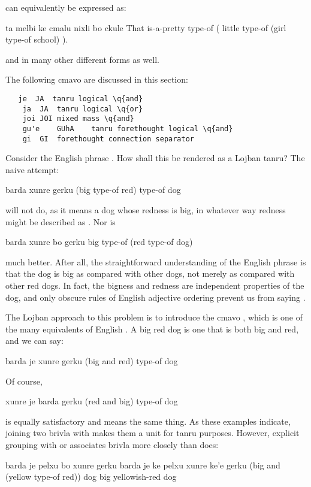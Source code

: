 {\noindent}can equivalently be expressed as:
\begin{example}
ta melbi\n
\T	ke cmalu nixli bo ckule \n
That is-a-pretty\n
\T	type-of ( little type-of (girl type-of school) ).
\end{example}

{\noindent}and in many other different forms as well.



The following cmavo are discussed in this section:
\begin{verbatim}
   je  JA  tanru logical \q{and}
    ja  JA  tanru logical \q{or}
    joi JOI mixed mass \q{and}
    gu'e    GUhA    tanru forethought logical \q{and}
    gi  GI  forethought connection separator
\end{verbatim}
    Consider the English phrase . How shall this be
    rendered as a Lojban tanru? The naive attempt:
\begin{example}
barda xunre gerku\n
(big type-of red) type-of dog
\end{example}

{\noindent}will not do, as it means a dog whose redness is big, in
    whatever way redness might be described as . Nor is
\begin{example}
barda xunre bo gerku\n
big type-of (red type-of dog)
\end{example}

{\noindent}much better. After all, the straightforward understanding of
    the English phrase is that the dog is big as compared with
    other dogs, not merely as compared with other red dogs. In
    fact, the bigness and redness are independent properties of the
    dog, and only obscure rules of English adjective ordering
    prevent us from saying . 

The Lojban approach to this problem is to introduce the
    cmavo , which is one of the many equivalents of English
    . A big red dog is one that is both big and red, and we
    can say:
\begin{example}
barda je xunre gerku\n
(big and red) type-of dog
\end{example}

Of course,
\begin{example}
xunre je barda gerku\n
(red and big) type-of dog
\end{example}

{\noindent}is equally satisfactory and means the same thing. As these
    examples indicate, joining two brivla with  makes them a
    unit for tanru purposes. However, explicit grouping with 
    or  associates brivla more closely than 
    does:
\begin{example}
barda je pelxu bo xunre gerku\n
barda je ke pelxu xunre ke'e gerku\n
(big and (yellow type-of red)) dog\n
big yellowish-red dog
\end{example}

